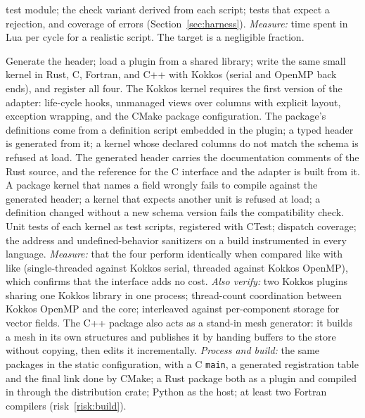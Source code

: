 \documentclass[11pt,a4paper]{article}
\newcommand{\code}[1]{\texttt{#1}}
\begin{document}
\begin{description}[style=nextline,leftmargin=2em]
        test module; the check variant derived from each script; tests that
        expect a rejection, and coverage of errors
        (Section~\ref{sec:harness}).
        \emph{Measure:} time spent in Lua per cycle for a realistic
        script.  The target is a negligible fraction.
  \item[M4. C interface and a foreign package.]
        Generate the header; load a plugin from a shared library; write the
        same small kernel in Rust, C, Fortran, and C++ with Kokkos (serial
        and OpenMP back ends), and register all four.  The Kokkos kernel
        requires the first version of the adapter: life-cycle hooks,
        unmanaged views over columns with explicit layout, exception
        wrapping, and the CMake package configuration.  The package's
        definitions come from a definition script embedded in the plugin; a
        typed header is generated from it; a kernel whose declared columns
        do not match the schema is refused at load.  The generated header
        carries the documentation comments of the Rust source, and the
        reference for the C interface and the adapter is built from it.
        A package kernel that names a field wrongly fails to compile against
        the generated header; a kernel that expects another unit is refused
        at load; a definition changed without a new schema version fails the
        compatibility check.  Unit tests of each kernel as test scripts,
        registered with CTest; dispatch coverage; the address and
        undefined-behavior sanitizers on a build instrumented in every
        language.
        \emph{Measure:} that the four perform identically when compared like
        with like (single-threaded against Kokkos serial, threaded against
        Kokkos OpenMP), which confirms that the interface adds no cost.
        \emph{Also verify:} two Kokkos plugins sharing one Kokkos library in
        one process; thread-count coordination between Kokkos OpenMP and the
        core; interleaved against per-component storage for vector fields.  The C++
        package also acts as a stand-in mesh generator: it builds a mesh in
        its own structures and publishes it by handing buffers to the store
        without copying, then edits it incrementally.
        \emph{Process and build:} the same packages in the static
        configuration, with a C \code{main}, a generated registration table
        and the final link done by CMake; a Rust package both as a plugin and
        compiled in through the distribution crate; Python as the host; at
        least two Fortran compilers (risk~\ref{risk:build}).

\end{description}
\end{document}
